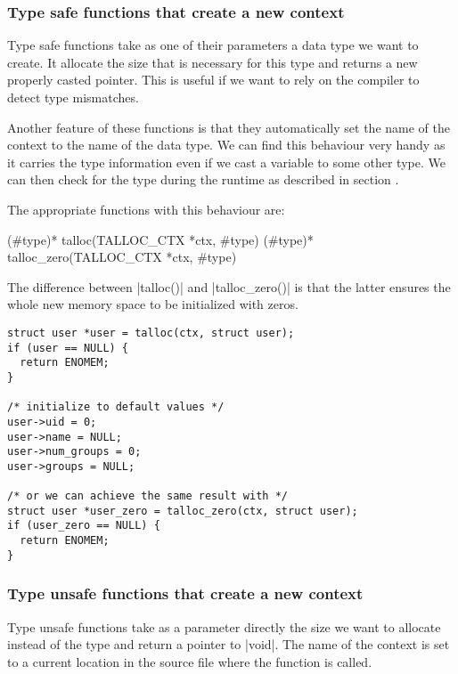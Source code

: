\subsubsection{Type safe functions that create a new context}

Type safe functions take as one of their parameters a data type we want to
create. It allocate the size that is necessary for this type and returns a new
properly casted pointer. This is useful if we want to rely on the compiler to
detect type mismatches.

Another feature of these functions is that they automatically set the name of
the context to the name of the data type. We can find this behaviour very handy
as it carries the type information even if we cast a variable to some other
type. We can then check for the type during the runtime as described in section
.

The appropriate functions with this behaviour are:

\begin{funcproto}
(#type)* talloc(TALLOC_CTX *ctx, #type)
(#type)* talloc_zero(TALLOC_CTX *ctx, #type)
\end{funcproto}
\funclistend
The difference between |talloc()| and |talloc_zero()| is that the latter ensures
the whole new memory space to be initialized with zeros.

\begin{lstlisting}[caption={talloc() and talloc_zero()},label=lst:talloc_zero]
struct user *user = talloc(ctx, struct user);
if (user == NULL) {
  return ENOMEM;
}

/* initialize to default values */
user->uid = 0;
user->name = NULL;
user->num_groups = 0;
user->groups = NULL;

/* or we can achieve the same result with */
struct user *user_zero = talloc_zero(ctx, struct user);
if (user_zero == NULL) {
  return ENOMEM;
}
\end{lstlisting}

\subsubsection{Type unsafe functions that create a new context}

Type unsafe functions take as a parameter directly the size we want to
allocate instead of the type and return a pointer to |void|. The name of the
context is set to a current location in the source file where the function is
called.

